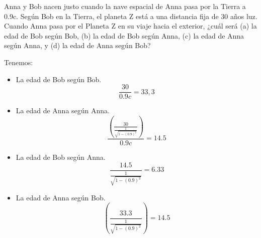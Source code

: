 \begin{problema}
    Anna y Bob nacen justo cuando la nave espacial de Anna pasa por la Tierra a 0.9c. Según Bob en la Tierra, el planeta Z está a una distancia fija de 30 años luz. Cuando Anna pasa por el Planeta Z en su viaje hacia el exterior, ¿cuál será (a) la edad de Bob según Bob, (b) la edad de Bob según Anna, (c) la edad de Anna según Anna, y (d) la edad de Anna según Bob?
    \begin{sol}
        Tenemos:
        \begin{itemize}
            \item La edad de Bob según Bob.
                $$\frac{30}{0.9c} = 33,3$$
            \item La edad de Anna según Anna.
                $$\frac{\left(\frac{30}{\frac{1}{\sqrt{1-(0.9)^2}}}\right)}{0.9c} = 14.5 $$
    
                
            \item La edad de Bob según Anna.
                $$\frac{14.5}{\frac{1}{\sqrt{1-(0.9)^2}}}= 6.33 $$
            
            \item La edad de Anna según Bob.
            $$\left(\frac{33.3}{\frac{1}{\sqrt{1-(0.9)^2}}}\right) = 14.5 $$

        \end{itemize}

    \end{sol}
\end{problema}

